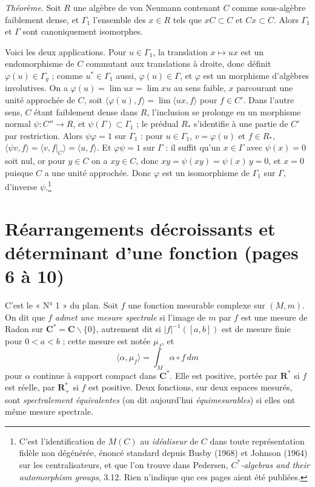 \documentclass[11pt,a4paper]{article}
\begin{document}
\emph{Théorème.} Soit $R$ une algèbre de von Neumann contenant $C$ comme
sous-algèbre faiblement dense, et $\Gamma_1$ l'ensemble des $x \in R$ tels
que $xC \subset C$ et $Cx \subset C$. Alors $\Gamma_1$ et $\Gamma$ sont
canoniquement isomorphes.

Voici les deux applications. Pour $u \in \Gamma_1$, la translation
$x \mapsto ux$ est un endomorphisme de $C$ commutant aux translations à
droite, donc définit $\varphi(u) \in \Gamma_g$ ; comme $u^{*} \in \Gamma_1$
aussi, $\varphi(u) \in \Gamma$, et $\varphi$ est un morphisme d'algèbres
involutives. On a $\varphi(u) = \lim ux = \lim xu$ au sens faible, $x$
parcourant une unité approchée de $C$, soit
$\langle \varphi(u), f\rangle = \lim \langle ux, f\rangle$ pour $f \in C'$.
Dans l'autre sens, $C$ étant faiblement dense dans $R$, l'inclusion se
prolonge en un morphisme normal $\psi : C'' \to R$, et $\psi(\Gamma) \subset
\Gamma_1$ ; le prédual $R_{*}$ s'identifie à une partie de $C'$ par
restriction. Alors $\psi\varphi = 1$ sur $\Gamma_1$ : pour $u \in \Gamma_1$,
$v = \varphi(u)$ et $f \in R_{*}$, $\langle \psi v, f\rangle = \langle v,
f|_C\rangle = \langle u, f\rangle$. Et $\varphi\psi = 1$ sur $\Gamma$ : il
suffit qu'un $x \in \Gamma$ avec $\psi(x) = 0$ soit nul, or pour $y \in C$
on a $xy \in C$, donc $xy = \psi(xy) = \psi(x)\,y = 0$, et $x = 0$ puisque
$C$ a une unité approchée. Donc $\varphi$ est un isomorphisme de $\Gamma_1$
sur $\Gamma$, d'inverse $\psi$.\footnote{C'est l'identification de $M(C)$ au
\emph{idéaliseur} de $C$ dans toute représentation fidèle non dégénérée,
énoncé standard depuis Busby (1968) et Johnson (1964) sur les
centralisateurs, et que l'on trouve dans Pedersen, \emph{$C^{*}$-algebras
and their automorphism groups}, 3.12. Rien n'indique que ces pages aient été
publiées.}

\section*{Réarrangements décroissants et déterminant d'une fonction (pages 6 à 10)}

C'est le « N° 1 » du plan. Soit $f$ une fonction mesurable complexe sur
$(M,m)$. On dit que $f$ \emph{admet une mesure spectrale} si l'image de $m$
par $f$ est une mesure de Radon sur $\mathbf{C}^{*} = \mathbf{C} \smallsetminus
\{0\}$, autrement dit si $|f|^{-1}([a,b])$ est de mesure finie pour
$0 < a < b$ ; cette mesure est notée $\mu_f$, et
\[
  \langle \alpha, \mu_f\rangle = \int_M \alpha\circ f\, dm
\]
pour $\alpha$ continue à support compact dans $\mathbf{C}^{*}$. Elle est
positive, portée par $\mathbf{R}^{*}$ si $f$ est réelle, par
$\mathbf{R}^{*}_{+}$ si $f$ est positive. Deux fonctions, sur deux espaces
mesurés, sont \emph{spectralement équivalentes} (on dit aujourd'hui
\emph{équimesurables}) si elles ont même mesure spectrale.
\end{document}
